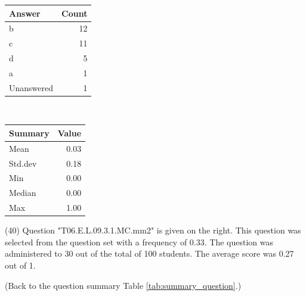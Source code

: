 \documentclass[12pt,nohyper]{tufte-handout}\usepackage[]{graphicx}\usepackage[]{color}
\begin{document}
\begin{center}%
\begin{tabular}{lr}
  \hline
Answer & Count \\ 
  \hline
b &  12 \\ 
  c &  11 \\ 
  d &   5 \\ 
  a &   1 \\ 
  Unanswered &   1 \\ 
   \hline
\end{tabular}
~~~~~~~~%
\begin{tabular}{lr}
  \hline
Summary & Value \\ 
  \hline
Mean & 0.03 \\ 
  Std.dev & 0.18 \\ 
  Min & 0.00 \\ 
  Median & 0.00 \\ 
  Max & 1.00 \\ 
   \hline
\end{tabular}
\end{center}\newpage{} (40) Question "T06.E.L.09.3.1.MC.mm2" is given on the right. This question was selected from the question set with a frequency of 0.33. The question was administered to 30 out of the total of 100 students. The average score was 0.27 out of 1.

 (Back to the question summary Table \ref{tab:summary_question}.)
\end{document}
